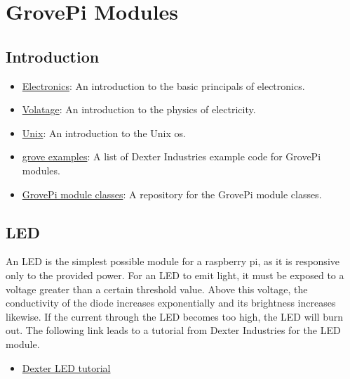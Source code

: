 

\chapter{GrovePi Modules}\label{grovepi-modules}

\FILENAME

\section{Introduction}\label{intro}

\begin{itemize}

\item
  \href{http://www.instructables.com/id/Basic-Electronics}{Electronics}:
  An introduction to the basic principals of electronics.
\item
  \href{https://learn.sparkfun.com/tutorials/voltage-current-resistance-and-ohms-law}{Volatage}:
  An introduction to the physics of electricity.
\item
  \href{https://info-ee.eps.surrey.ac.uk/Teaching/Unix/index.html}{Unix}:
  An introduction to the Unix os.
\item
  \href{https://github.com/DexterInd/GrovePi/tree/master/Software/Python}{grove
  examples}: A list of Dexter Industries example code for GrovePi
  modules.
\item
  \href{https://github.com/cloudmesh/cloudmesh.pi/tree/master/cloudmesh/pi}{GrovePi
  module classes}: A repository for the GrovePi module classes.
\end{itemize}

\section{LED}\label{led}

An LED is the simplest possible module for a raspberry pi, as it is
responsive only to the provided power. For an LED to emit light, it must
be exposed to a voltage greater than a certain threshold value. Above
this voltage, the conductivity of the diode increases exponentially and
its brightness increases likewise. If the current through the LED
becomes too high, the LED will burn out. The following link leads to a
tutorial from Dexter Industries for the LED module.

\begin{itemize}

\item
  \href{https://www.dexterindustries.com/GrovePi/projects-for-the-raspberry-pi/raspberry-pi-led-tutorial/}{Dexter
  LED tutorial}
\end{itemize}

